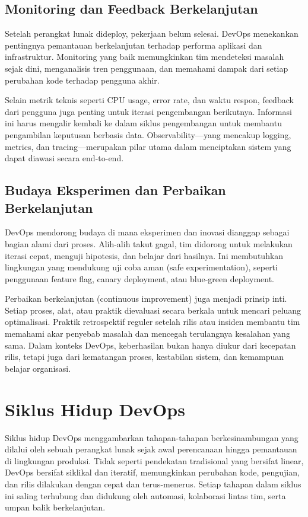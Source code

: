 \subsection{Monitoring dan Feedback Berkelanjutan}

Setelah perangkat lunak dideploy, pekerjaan belum selesai. DevOps menekankan pentingnya pemantauan berkelanjutan terhadap performa aplikasi dan infrastruktur. Monitoring yang baik memungkinkan tim mendeteksi masalah sejak dini, menganalisis tren penggunaan, dan memahami dampak dari setiap perubahan kode terhadap pengguna akhir.

Selain metrik teknis seperti CPU usage, error rate, dan waktu respon, feedback dari pengguna juga penting untuk iterasi pengembangan berikutnya. Informasi ini harus mengalir kembali ke dalam siklus pengembangan untuk membantu pengambilan keputusan berbasis data. Observability—yang mencakup logging, metrics, dan tracing—merupakan pilar utama dalam menciptakan sistem yang dapat diawasi secara end-to-end.

\subsection{Budaya Eksperimen dan Perbaikan Berkelanjutan}

DevOps mendorong budaya di mana eksperimen dan inovasi dianggap sebagai bagian alami dari proses. Alih-alih takut gagal, tim didorong untuk melakukan iterasi cepat, menguji hipotesis, dan belajar dari hasilnya. Ini membutuhkan lingkungan yang mendukung uji coba aman (safe experimentation), seperti penggunaan feature flag, canary deployment, atau blue-green deployment.

Perbaikan berkelanjutan (continuous improvement) juga menjadi prinsip inti. Setiap proses, alat, atau praktik dievaluasi secara berkala untuk mencari peluang optimalisasi. Praktik retrospektif reguler setelah rilis atau insiden membantu tim memahami akar penyebab masalah dan mencegah terulangnya kesalahan yang sama. Dalam konteks DevOps, keberhasilan bukan hanya diukur dari kecepatan rilis, tetapi juga dari kematangan proses, kestabilan sistem, dan kemampuan belajar organisasi.


\section{Siklus Hidup DevOps}

Siklus hidup DevOps menggambarkan tahapan-tahapan berkesinambungan yang dilalui oleh sebuah perangkat lunak sejak awal perencanaan hingga pemantauan di lingkungan produksi. Tidak seperti pendekatan tradisional yang bersifat linear, DevOps bersifat siklikal dan iteratif, memungkinkan perubahan kode, pengujian, dan rilis dilakukan dengan cepat dan terus-menerus. Setiap tahapan dalam siklus ini saling terhubung dan didukung oleh automasi, kolaborasi lintas tim, serta umpan balik berkelanjutan.

